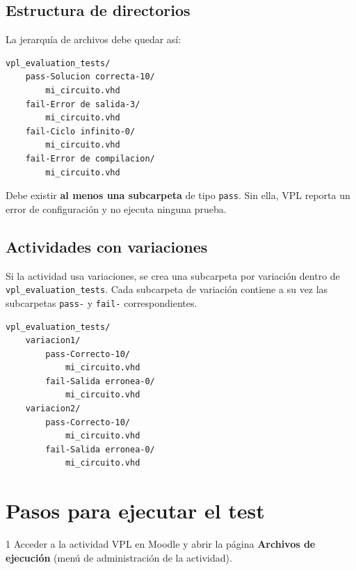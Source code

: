 \documentclass[12pt, a4paper, twoside, openany]{book}
\begin{document}
\subsection{Estructura de directorios}

La jerarquía de archivos debe quedar así:

\begin{lstlisting}[caption={Estructura mínima de \texttt{vpl\_evaluation\_tests}},
                   label={lst:test-dir}, numbers=none]
vpl_evaluation_tests/
    pass-Solucion correcta-10/
        mi_circuito.vhd
    fail-Error de salida-3/
        mi_circuito.vhd
    fail-Ciclo infinito-0/
        mi_circuito.vhd
    fail-Error de compilacion/
        mi_circuito.vhd
\end{lstlisting}

\begin{notebox}
  Debe existir \textbf{al menos una subcarpeta} de tipo \texttt{pass}.
  Sin ella, VPL reporta un error de configuración y no ejecuta ninguna prueba.
\end{notebox}

\subsection{Actividades con variaciones}

Si la actividad usa variaciones, se crea una subcarpeta por variación dentro de
\texttt{vpl\_evaluation\_tests}. Cada subcarpeta de variación contiene a su vez
las subcarpetas \texttt{pass-} y \texttt{fail-} correspondientes.

\begin{lstlisting}[caption={Estructura con variaciones},
                   label={lst:test-dir-var}, numbers=none]
vpl_evaluation_tests/
    variacion1/
        pass-Correcto-10/
            mi_circuito.vhd
        fail-Salida erronea-0/
            mi_circuito.vhd
    variacion2/
        pass-Correcto-10/
            mi_circuito.vhd
        fail-Salida erronea-0/
            mi_circuito.vhd
\end{lstlisting}

\section{Pasos para ejecutar el test}
\label{sec:test-pasos}

\begin{stepbox}{1}
  Acceder a la actividad VPL en Moodle y abrir la página
  \textbf{Archivos de ejecución} (menú de administración de la actividad).
\end{stepbox}
\end{document}
